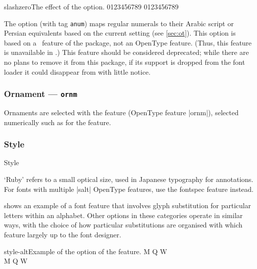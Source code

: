 \documentclass[a4paper]{l3doc}
\begin{document}
\begin{Lexample}{slashzero}{The effect of the  option.}
   0123456789
   0123456789
\end{Lexample}

The  option (with tag \verb|anum|) maps regular numerals to their Arabic script or Persian equivalents
based on the current  setting (see \vref{sec:ot}).
This option is based on a \LuaTeX\ feature of the  package,
not an OpenType feature. (Thus, this feature is unavailable in \XeTeX.)
This feature should be considered deprecated; while there are no plans to remove it from this package,
if its support is dropped from the font loader it could disappear from  with little notice.


\subsubsection{Ornament --- \texttt{ornm}}

Ornaments are selected with the  feature (OpenType feature |ornm|),
selected numerically such as for the  feature.


\subsubsection{Style}
\label{sec:ot-feat-style}

\begin{features}{Style}
\end{features}

`Ruby' refers to a small optical size, used in
Japanese typography for annotations.
For fonts with multiple |salt| OpenType features,
use the fontspec  feature instead.

 shows an example of a font feature that involves glyph substitution
for particular letters within an alphabet.
Other options in these categories operate in similar ways, with the choice of how
particular substitutions are organised with which feature largely up to the font designer.

 \begin{Xexample}[firstline=2]{style-alt}{Example of the  option of the  feature.}
  \Large
   M Q W                      \\
   M Q W
\end{Xexample}
\end{document}

